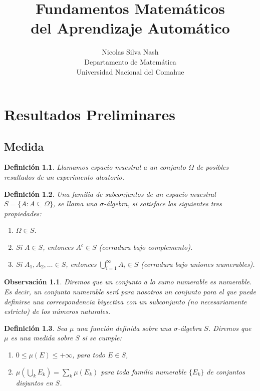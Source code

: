 \documentclass{report}
\newtheorem{dfn}{Definición}[section]
\newtheorem{obs}{Observación}[section]
\begin{document}
\title{Fundamentos Matemáticos \\ del Aprendizaje Automático}
\author{Nicolas Silva Nash \\ Departamento de Matemática \\ Universidad Nacional del Comahue}
\maketitle
\tableofcontents
\chapter{Resultados Preliminares}
\section{Medida}

\begin{dfn}
    Llamamos \textit{espacio muestral} a un conjunto $\Omega$ de posibles resultados de un experimento aleatorio.
\end{dfn}
\begin{dfn}
Una familia de subconjuntos de un espacio muestral $S=\{A: A\subseteq\Omega\}$,  se llama una $\sigma$-\emph{álgebra}, si satisface las siguientes tres propiedades:

\begin{enumerate}
    \item \( \Omega \in S \).
    \item Si \( A \in S \), entonces \( A^c \in S \) (cerradura bajo complemento).
    \item Si \( A_1, A_2, \ldots \in S \), entonces \( \bigcup_{i=1}^\infty A_i \in S \) (cerradura bajo uniones numerables).
\end{enumerate}
\end{dfn}

\begin{obs}
    Diremos que un conjunto a lo sumo numerable es numerable. Es decir, un conjunto numerable será para nosotros un conjunto
    para el que puede definirse una correspondencia biyectiva con un subconjunto (no necesariamente estricto) de los números naturales.
\end{obs}

\begin{dfn}
Sea \( \mu \) una función definida sobre una \(\sigma\)-álgebra \( S \). Diremos que \( \mu \) es una \textit{medida} sobre \( S \) si se cumple:

\begin{enumerate}
  \item \( 0 \leq \mu(E) \leq +\infty \), para todo \( E \in S \),
  \item \( \mu\left( \displaystyle\bigcup_k E_k \right) = \displaystyle\sum_k \mu(E_k) \) para toda familia numerable \( \{E_k\} \) de conjuntos disjuntos en \( S \).
\end{enumerate}
\end{dfn}
\end{document}

